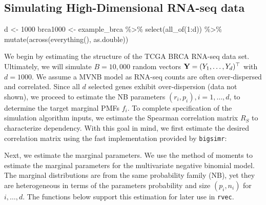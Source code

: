 \documentclass{article}
\newenvironment{Shaded}{\begin{snugshade}}{\end{snugshade}}
\newcommand{\CommentTok}[1]{\textcolor[rgb]{0.56,0.35,0.01}{\textit{#1}}}
\newcommand{\DecValTok}[1]{\textcolor[rgb]{0.00,0.00,0.81}{#1}}
\newcommand{\FunctionTok}[1]{\textcolor[rgb]{0.00,0.00,0.00}{#1}}
\newcommand{\NormalTok}[1]{#1}
\newcommand{\OtherTok}[1]{\textcolor[rgb]{0.56,0.35,0.01}{#1}}
\newcommand{\SpecialCharTok}[1]{\textcolor[rgb]{0.00,0.00,0.00}{#1}}
\begin{document}
\hypertarget{simulating-high-dimensional-rna-seq-data}{%
\subsection{Simulating High-Dimensional RNA-seq
data}\label{simulating-high-dimensional-rna-seq-data}}

\begin{Shaded}
\begin{Highlighting}[]
\NormalTok{d }\OtherTok{\textless{}{-}} \DecValTok{1000}
\NormalTok{brca1000 }\OtherTok{\textless{}{-}}\NormalTok{ example\_brca }\SpecialCharTok{\%\textgreater{}\%}
  \FunctionTok{select}\NormalTok{(}\FunctionTok{all\_of}\NormalTok{(}\DecValTok{1}\SpecialCharTok{:}\NormalTok{d)) }\SpecialCharTok{\%\textgreater{}\%}
  \FunctionTok{mutate}\NormalTok{(}\FunctionTok{across}\NormalTok{(}\FunctionTok{everything}\NormalTok{(), as.double))}
\end{Highlighting}
\end{Shaded}

We begin by estimating the structure of the TCGA BRCA RNA-seq data set.
Ultimately, we will simulate \(B=10,000\) random vectors
\({\bf Y}=(Y_1, \ldots, Y_d)^\top\) with \(d=1000\). We assume a MVNB
model as RNA-seq counts are often over-dispersed and correlated. Since
all \(d\) selected genes exhibit over-dispersion (data not shown), we
proceed to estimate the NB parameters \((r_i, p_i), i=1,\ldots,d\), to
determine the target marginal PMFs \(f_i\). To complete specification of
the simulation algorithm inputs, we estimate the Spearman correlation
matrix \(R_S\) to characterize dependency. With this goal in mind, we
first estimate the desired correlation matrix using the fast
implementation provided by \texttt{bigsimr}:

\begin{Shaded}
\end{Shaded}

Next, we estimate the marginal parameters. We use the method of moments
to estimate the marginal parameters for the multivariate negative
binomial model. The marginal distributions are from the same probability
family (NB), yet they are heterogeneous in terms of the parameters
probability and size \((p_i, n_i)\) for \(i,\ldots,d\). The functions
below support this estimation for later use in \texttt{rvec}.
\end{document}
